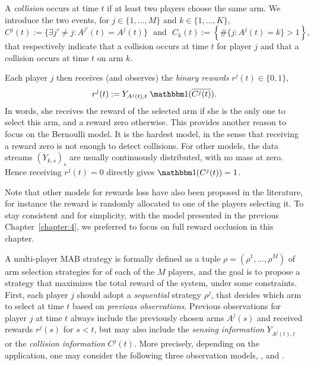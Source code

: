 \begin{definition}
  A \emph{collision} occurs at time $t$ if at least two players choose the same arm.
  We introduce the two events, for $j\in\{1,\dots,M\}$ and $k\in\{1,\dots,K\}$,
  \begin{equation}
    C^j(t) :=  \{ \exists j' \neq j : A^{j'}(t) = A^j(t) \}
    \ \ \ \text{and} \ \ \ C_k(t) :=  \left\{ \# \{ j : A^j(t) = k\} > 1 \right\},
  \end{equation}
  that respectively indicate that a collision occurs at time $t$ for player $j$ and that a collision occurs at time $t$ on arm $k$.
\end{definition}

Each player $j$ then receives (and observes) the \emph{binary rewards}
$r^j(t) \in \{0,1\}$,
\begin{equation}
  r^j(t) := Y_{A^j(t),t} \; \indic(\overline{C^j(t)}).
\end{equation}
In words, she receives the reward of the selected arm if she is the only one to select this arm, and a reward zero otherwise.
This provides another reason to focus on the Bernoulli model. It is the hardest model, in the sense that receiving a reward zero is not enough to detect collisions. For other models, the data streams $(Y_{k,s})_s$ are usually continuously distributed, with no mass at zero. Hence receiving $r^j(t) = 0$ directly gives $\indic(C^j(t)) = 1$.

Note that other models for rewards loss have also been proposed in the literature, for instance the reward is randomly allocated to one of the players selecting it.
To stay consistent and for simplicity, with the model presented in the previous Chapter~\ref{chapter:4},
we preferred to focus on full reward occlusion in this chapter.


A multi-player MAB strategy is formally defined as a tuple $\rho = (\rho^1,\dots,\rho^M)$ of arm selection strategies for of each of the $M$ players, and the goal is to propose a strategy that maximizes the total reward of the system, under some constraints.
First, each player $j$ should adopt a \emph{sequential} strategy $\rho^j$, that decides which arm to select at time $t$ based on \emph{previous observations}.
Previous observations for player $j$ at time $t$ always include the previously chosen arms $A^j(s)$ and received rewards $r^j(s)$ for $s<t$, but may also include the \emph{sensing information} $Y_{A^j(t),t}$ or the \emph{collision information} $C^j(t)$.
More precisely, depending on the application, one may consider the following three observation models, \modelun, \modeldeux{} and \modeltrois.

